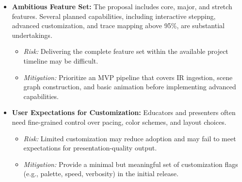 \begin{itemize}
  \item \textbf{Ambitious Feature Set:} The proposal includes core, major, and stretch features. Several planned capabilities, including interactive stepping, advanced customization, and trace mapping above 95\%, are substantial undertakings.
  \begin{itemize}
    \item \textit{Risk:} Delivering the complete feature set within the available project timeline may be difficult.
    \item \textit{Mitigation:} Prioritize an MVP pipeline that covers IR ingestion, scene graph construction, and basic animation before implementing advanced capabilities.
  \end{itemize}

  \item \textbf{User Expectations for Customization:} Educators and presenters often need fine-grained control over pacing, color schemes, and layout choices.
  \begin{itemize}
    \item \textit{Risk:} Limited customization may reduce adoption and may fail to meet expectations for presentation-quality output.
    \item \textit{Mitigation:} Provide a minimal but meaningful set of customization flags (e.g., palette, speed, verbosity) in the initial release.
  \end{itemize}
\end{itemize}
